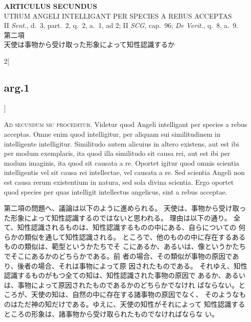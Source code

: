 \documentclass[paper=a4paper,fontsize=10pt,jafontsize=9pt,titlepage]{jlreq}
\begin{document}
\begin{center}
 {\Large {\bfseries ARTICULUS SECUNDUS}}\\
 {\large UTRUM ANGELI INTELLIGANT PER SPECIES A REBUS ACCEPTAS}\\
 {\footnotesize II {\itshape Sent.}, d.~3, part.~2, q.~2, a.~1, ad 2; II
 {\itshape SCG}, cap.~96; {\itshape De Verit.}, q.~8, a.~9.}\\
 {\Large 第二項\\天使は事物から受け取った形象によって知性認識するか}
\end{center}

\begin{paracol}{2}[\subsection{arg.1}]

{\huge A}{\scshape d secundum sic proceditur}. Videtur quod Angeli
intelligant per species a rebus acceptas. Omne enim quod intelligitur,
per aliquam sui similitudinem in intelligente intelligitur. Similitudo
autem alicuius in altero existens, aut est ibi per modum exemplaris, ita
quod illa similitudo sit causa rei, aut est ibi per modum imaginis, ita
quod sit causata a re. Oportet igitur quod omnis scientia intelligentis
vel sit causa rei intellectae, vel causata a re. Sed scientia Angeli non
est causa rerum existentium in natura, sed sola divina scientia. Ergo
oportet quod species per quas intelligit intellectus angelicus, sint a
rebus acceptae.

\switchcolumn

第二項の問題へ、議論は以下のように進められる。
 天使は、事物から受け取った形象によって知性認識するのではないと思われる。
 理由は以下の通り。
 全て、知性認識されるものは、知性認識するものの中にある、自らについての
 何らかの類似を通して知性認識される。
 ところで、他のものの中に存在するあるものの類似は、範型というかたちでそ
 こにあるか、あるいは、像というかたちでそこにあるかのどちらかである。前
 者の場合、その類似が事物の原因であり、後者の場合、それは事物によって原
 因されたものである。
 それゆえ、知性認識するものがもつ全ての知は、知性認識された事物の原因で
 あるか、あるいは、事物によって原因されたものであるかのどちらかでなけれ
 ばならない。ところが、天使の知は、自然の中に存在する諸事物の原因でなく、
 そのようなものはただ神の知だけである。ゆえに、天使の知性がそれによって
 知性認識するところの形象は、諸事物から受け取られたものでなければならな
 い。



\end{paracol}
\end{document}
